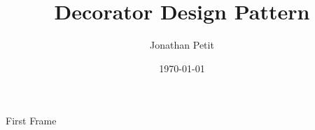 \documentclass{beamer}
\title{Decorator Design Pattern}
\date{\today}
\author{Jonathan Petit}
\institute{ECAM}
\begin{document}
  \maketitle
  \begin{frame}{First Frame}
  \end{frame}
\end{document}
